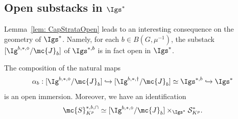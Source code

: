 \documentclass[letterpaper,11pt]{amsart}
\begin{document}
\subsection{Open substacks in \texorpdfstring{$\Igs^\ast$}{}}\label{sec: OpenStratainIgs}
Lemma~\ref{lem: CapStrataOpen} leads to an interesting consequence on the geometry of $\Igs^\ast$. Namely, for each $b\in B(G,\mu^{-1})$, the substack $[\Ig^{b,\ast,\diamond}/\mc{J}_b]$ of $\Igs^{\ast,b}$ is in fact open in $\Igs^{\ast}$.

\begin{proposition}\label{prop: openstrata}
    The composition of the natural maps 
    \[\alpha_b: [\Ig^{b,\ast,\diamond}/\mc{J}_b]\hookrightarrow [\Ig^{b,\ast,\dagger}/\mc{J}_b]\simeq \Igs^{\ast,b}\hookrightarrow\Igs^\ast\]
    is an open immersion. Moreover, we have an identification 
    \begin{equation}\label{eq: CapStrata}
        \mc{S}_{K^p}^{\ast,b,\cap}\simeq [\Ig^{b,\ast,\diamond}/\mc{J}_b]\times_{\Igs^\ast}\mathcal{S}^*_{K^p}.
    \end{equation}
\end{proposition}
\end{document}
